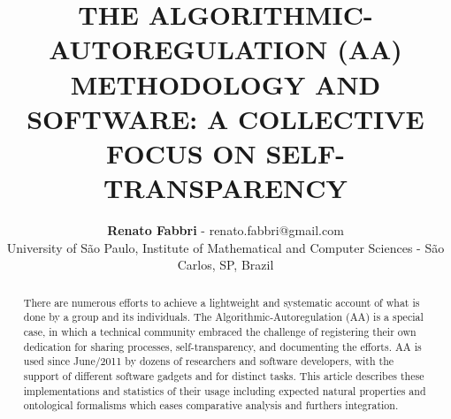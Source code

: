 \documentclass[12pt,fleqn]{article}
\title{THE ALGORITHMIC-AUTOREGULATION (AA) METHODOLOGY AND SOFTWARE: A COLLECTIVE FOCUS ON SELF-TRANSPARENCY}
\author
    {\rm \begin{tabular}{l} 
    \textbf{Renato Fabbri}$$ - {\textnormal renato.fabbri@gmail.com}\\%
    {\fontsize{11}{0}\selectfont University of São Paulo, Institute of Mathematical and Computer Sciences - São Carlos, SP, Brazil}\vspace*{-0.05cm} \\
  \end{tabular}}
\renewcommand{\headrulewidth}{0.0pt}
\begin{document}
\maketitle

\thispagestyle{firspagetstyle}

\renewcommand{\headrulewidth}{0.0pt}
\rhead{}

\begin{abstract}
There are numerous efforts to achieve a lightweight and systematic account of what is done by a group and its individuals.
The Algorithmic-Autoregulation (AA) is a special case,
in which a technical community embraced the challenge of registering their own dedication
for sharing processes, self-transparency, and documenting the efforts.
AA is used since June/2011 by dozens of researchers and software developers,
with the support of different software gadgets and for distinct tasks.
This article describes these implementations and statistics of their usage
including expected natural properties and ontological formalisms 
which eases comparative analysis and furthers integration.
\end{abstract}


\pagestyle{fancy}
\end{document}
